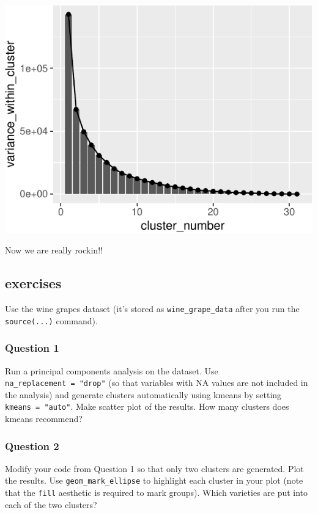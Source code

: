 \documentclass[
]{krantz}
\begin{document}
\begin{center}\includegraphics{index_files/figure-latex/unnamed-chunk-109-1} \end{center}

Now we are really rockin!!

\hypertarget{exercises-5}{%
\subsection{exercises}\label{exercises-5}}

Use the wine grapes dataset (it's stored as \texttt{wine\_grape\_data} after you run the \texttt{source(...)} command).

\hypertarget{question-1}{%
\subsubsection{Question 1}\label{question-1}}

Run a principal components analysis on the dataset. Use \texttt{na\_replacement\ =\ "drop"} (so that variables with NA values are not included in the analysis) and generate clusters automatically using kmeans by setting \texttt{kmeans\ =\ "auto"}. Make scatter plot of the results. How many clusters does kmeans recommend?

\hypertarget{question-2}{%
\subsubsection{Question 2}\label{question-2}}

Modify your code from Question 1 so that only two clusters are generated. Plot the results. Use \texttt{geom\_mark\_ellipse} to highlight each cluster in your plot (note that the \texttt{fill} aesthetic is required to mark groups). Which varieties are put into each of the two clusters?
\end{document}
